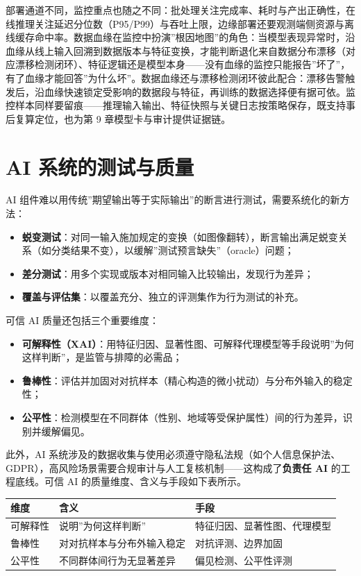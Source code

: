 \documentclass[12pt,a4paper,twoside,openany]{ctexbook}
\numberwithin{figure}{chapter}
\numberwithin{table}{chapter}
\providecommand{\tightlist}{\setlength{\itemsep}{0pt}\setlength{\parskip}{0pt}}
\newcounter{none}
\begin{document}
部署通道不同，监控重点也随之不同：批处理关注完成率、耗时与产出正确性，在线推理关注延迟分位数（P95/P99）与吞吐上限，边缘部署还要观测端侧资源与离线缓存命中率。数据血缘在监控中扮演''根因地图''的角色：当模型表现异常时，沿血缘从线上输入回溯到数据版本与特征变换，才能判断退化来自数据分布漂移（对应漂移检测闭环）、特征逻辑还是模型本身------没有血缘的监控只能报告''坏了''，有了血缘才能回答''为什么坏''。数据血缘还与漂移检测闭环彼此配合：漂移告警触发后，沿血缘快速锁定受影响的数据段与特征，再训练的数据选择便有据可依。监控样本同样要留痕------推理输入输出、特征快照与关键日志按策略保存，既支持事后复算定位，也为第
9 章模型卡与审计提供证据链。

\section{AI
系统的测试与质量}\label{ai-ux7cfbux7edfux7684ux6d4bux8bd5ux4e0eux8d28ux91cf}

AI
组件难以用传统''期望输出等于实际输出''的断言进行测试，需要系统化的新方法：

\begin{itemize}
\tightlist
\item
  \textbf{蜕变测试}：对同一输入施加规定的变换（如图像翻转），断言输出满足蜕变关系（如分类结果不变），以缓解''测试预言缺失''（oracle）问题；
\item
  \textbf{差分测试}：用多个实现或版本对相同输入比较输出，发现行为差异；
\item
  \textbf{覆盖与评估集}：以覆盖充分、独立的评测集作为行为测试的补充。
\end{itemize}

可信 AI 质量还包括三个重要维度：

\begin{itemize}
\tightlist
\item
  \textbf{可解释性（XAI）}：用特征归因、显著性图、可解释代理模型等手段说明''为何这样判断''，是监管与排障的必需品；
\item
  \textbf{鲁棒性}：评估并加固对对抗样本（精心构造的微小扰动）与分布外输入的稳定性；
\item
  \textbf{公平性}：检测模型在不同群体（性别、地域等受保护属性）间的行为差异，识别并缓解偏见。
\end{itemize}

此外，AI
系统涉及的数据收集与使用必须遵守隐私法规（如个人信息保护法、GDPR），高风险场景需要合规审计与人工复核机制------这构成了\textbf{负责任
AI} 的工程底线。可信 AI 的质量维度、含义与手段如下表所示。

{\def\LTcaptype{none} %
\begin{longtable}[]{@{}lll@{}}
\toprule\noalign{}
维度 & 含义 & 手段 \\
\midrule\noalign{}
\endhead
\bottomrule\noalign{}
\endlastfoot
可解释性 & 说明''为何这样判断'' & 特征归因、显著性图、代理模型 \\
鲁棒性 & 对对抗样本与分布外输入稳定 & 对抗评测、边界加固 \\
公平性 & 不同群体间行为无显著差异 & 偏见检测、公平性评测 \\
\end{longtable}
}
\end{document}
